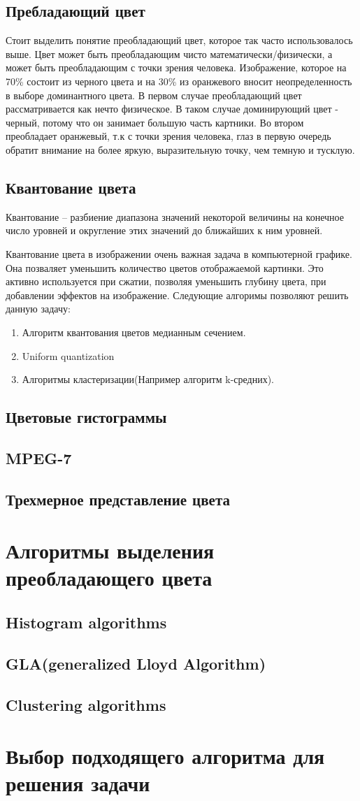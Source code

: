 \subsection{ Пребладающий цвет}
Стоит выделить понятие преобладающий цвет, которое так часто использовалось выше. Цвет может быть преобладающим чисто математически/физически, а может быть преобладающим с точки зрения человека. Изображение, которое на 70\% состоит из черного цвета и на 30\% из оранжевого вносит неопределенность в выборе доминантного цвета. В первом случае преобладающий цвет рассматривается как нечто физическое. В таком случае доминирующий цвет - черный, потому что он занимает большую часть картники. Во втором преобладает оранжевый, т.к с точки зрения человека, глаз в первую очередь обратит внимание на более яркую, выразительную точку, чем темную и тусклую.
\subsection{ Квантование цвета}
Квантование -- разбиение диапазона значений некоторой величины на конечное число уровней и округление этих значений до ближайших к ним уровней.

Квантование цвета в изображении очень важная задача в компьютерной графике. Она позваляет уменьшить количество цветов отображаемой картинки. Это активно используется при сжатии, позволяя уменьшить глубину цвета, при добавлении эффектов на изображение. Следующие алгоримы позволяют решить данную задачу:
\begin{enumerate}
	\item Алгоритм квантования цветов медианным сечением.
	\item Uniform quantization
	\item Алгоритмы кластеризации(Например алгоритм k-средних).
\end{enumerate}

\subsection{ Цветовые гистограммы}
\subsection{ MPEG-7}
\subsection{ Трехмерное представление цвета}

\section{ Алгоритмы выделения преобладающего цвета}
\subsection{ Histogram algorithms}
\subsection{ GLA(generalized Lloyd Algorithm)}
\subsection{ Clustering algorithms}

\section{ Выбор подходящего алгоритма для решения задачи}
